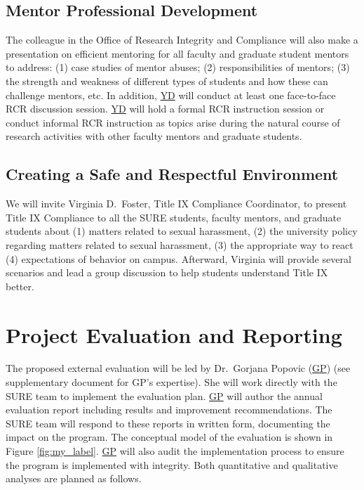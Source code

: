 \documentclass[11pt]{NSFamsart}
\newcommand{\GP}{\hyperlink{GPlink}{GP}\xspace}
\newcommand{\YD}{\hyperlink{YDlink}{YD}\xspace}
\begin{document}
 \subsection{Mentor Professional Development}
The colleague in the Office of Research Integrity and Compliance will also make a presentation on efficient mentoring for all faculty and graduate student mentors to address: (1) case studies
of mentor abuses; (2) responsibilities of mentors; (3) the strength and weakness of different types of students and how these can challenge mentors, etc. In addition, \YD will conduct at least one face-to-face RCR discussion session. \YD will hold a formal RCR instruction session or conduct informal RCR instruction as topics arise during the natural course of research activities with other faculty mentors and graduate students. 





\subsection{Creating a Safe and Respectful Environment} 
We will invite Virginia D.\ Foster, Title IX Compliance Coordinator, to present Title IX Compliance to all the SURE students, faculty mentors, and graduate students about
(1) matters related to sexual harassment,
(2) the university policy regarding matters related to sexual harassment,
(3) the appropriate way to react
(4) expectations of behavior on campus. Afterward, Virginia will provide several scenarios and lead a group discussion to help students understand Title IX better. 


\section{Project Evaluation and Reporting}
The proposed external evaluation will be led by \hypertarget{GPlink}{Dr.~Gorjana Popovic} (\GP) (see supplementary document for GP’s expertise). She will work directly with the SURE team to implement the evaluation plan.  \GP will author the annual evaluation report including results and improvement recommendations. The SURE team will respond to these reports in written form, documenting
the impact on the program. The conceptual model of the evaluation is shown in Figure \ref{fig:my_label}. \GP will also audit the implementation process
to ensure the program is implemented with integrity. Both quantitative and qualitative analyses are planned as follows.
\end{document}
